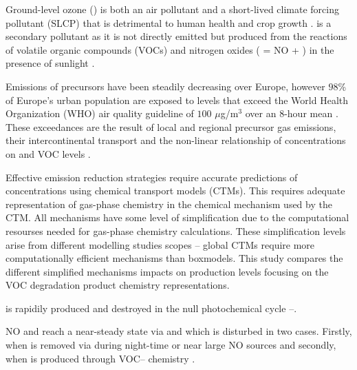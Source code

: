 Ground-level ozone () is both an air pollutant and a short-lived climate forcing pollutant (SLCP) that is detrimental to human health and crop growth \citep{AQEU:2013}. 
 is a secondary pollutant as it is not directly emitted but produced from the reactions of volatile organic compounds (VOCs) and nitrogen oxides ( = NO + ) in the presence of sunlight \citep{Atkinson:2000}.

Emissions of  precursors have been steadily decreasing over Europe, however $98$\% of Europe's urban population are exposed to levels that exceed the World Health Organization (WHO) air quality guideline of $100$ $\mu$g/m$^3$ over an $8$-hour mean \citep{WHO:2006}. 
These exceedances are the result of local and regional  precursor gas emissions, their intercontinental transport and the non-linear relationship of  concentrations on  and VOC levels \citep{AQEU:2013}.

Effective emission reduction strategies require accurate predictions of  concentrations using chemical transport models (CTMs). 
This requires adequate representation of gas-phase chemistry in the chemical mechanism used by the CTM. 
All mechanisms have some level of simplification due to the computational resourses needed for gas-phase chemistry calculations. 
These simplification levels arise from different modelling studies scopes -- global CTMs require more computationally efficient mechanisms than boxmodels. 
This study compares the different simplified mechanisms impacts on  production levels focusing on the VOC degradation product chemistry representations.

 is rapidily produced and destroyed in the null photochemical cycle --. 
\begin{reactionlist}
\end{reactionlist}
NO and  reach a near-steady state via  and  which is disturbed in two cases. 
Firstly, when  is removed via  during night-time or near large NO sources and secondly, when  is produced through VOC-- chemistry \citep{Sillman:1999}.

